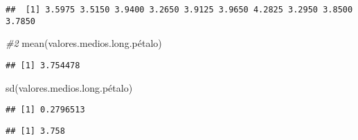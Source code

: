\documentclass[
]{article}
\newenvironment{Shaded}{\begin{snugshade}}{\end{snugshade}}
\newcommand{\AttributeTok}[1]{\textcolor[rgb]{0.77,0.63,0.00}{#1}}
\newcommand{\CommentTok}[1]{\textcolor[rgb]{0.56,0.35,0.01}{\textit{#1}}}
\newcommand{\ConstantTok}[1]{\textcolor[rgb]{0.00,0.00,0.00}{#1}}
\newcommand{\DecValTok}[1]{\textcolor[rgb]{0.00,0.00,0.81}{#1}}
\newcommand{\FunctionTok}[1]{\textcolor[rgb]{0.00,0.00,0.00}{#1}}
\newcommand{\NormalTok}[1]{#1}
\newcommand{\OtherTok}[1]{\textcolor[rgb]{0.56,0.35,0.01}{#1}}
\newcommand{\SpecialCharTok}[1]{\textcolor[rgb]{0.00,0.00,0.00}{#1}}
\begin{document}
\begin{Shaded}
\end{Shaded}

\begin{verbatim}
##  [1] 3.5975 3.5150 3.9400 3.2650 3.9125 3.9650 4.2825 3.2950 3.8500 3.7850
\end{verbatim}

\begin{Shaded}
\begin{Highlighting}[]
\CommentTok{\#2}
\FunctionTok{mean}\NormalTok{(valores.medios.long.pétalo)}
\end{Highlighting}
\end{Shaded}

\begin{verbatim}
## [1] 3.754478
\end{verbatim}

\begin{Shaded}
\begin{Highlighting}[]
\FunctionTok{sd}\NormalTok{(valores.medios.long.pétalo)}
\end{Highlighting}
\end{Shaded}

\begin{verbatim}
## [1] 0.2796513
\end{verbatim}

\begin{Shaded}
\end{Shaded}

\begin{verbatim}
## [1] 3.758
\end{verbatim}
\end{document}
